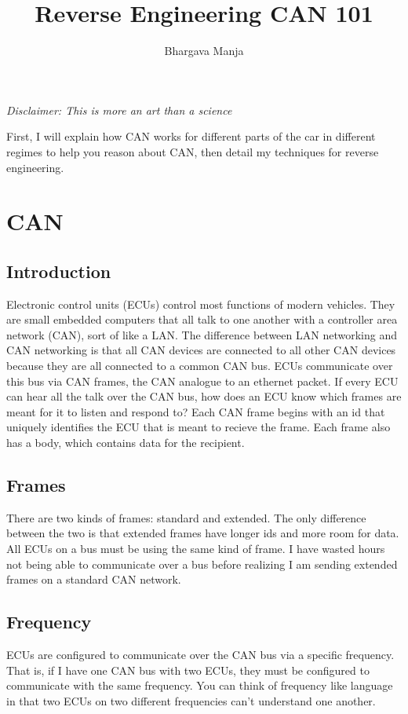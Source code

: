 \documentclass[12pt]{article}
\begin{document}
\title{Reverse Engineering CAN 101}
\author{Bhargava Manja}
\maketitle

\textit{Disclaimer: This is more an art than a science}

First, I will explain how CAN works for different parts of the car in different
regimes to help you reason about CAN, then detail my techniques for reverse
engineering.

\section{CAN}
\subsection{Introduction}
Electronic control units (ECUs) control most functions of modern vehicles. They
are small embedded computers that all talk to one another with a controller
area network (CAN), sort of like a LAN. The difference between LAN networking
and CAN networking is that all CAN devices are connected to all other CAN devices
because they are all connected to a common CAN bus. ECUs communicate over this
bus via CAN frames, the CAN analogue to an ethernet packet. If every ECU can
hear all the talk over the CAN bus, how does an ECU know which frames are meant
for it to listen and respond to? Each CAN frame begins with an id that uniquely
identifies the ECU that is meant to recieve the frame. Each frame also has
a body, which contains data for the recipient. 

\subsection{Frames}
There are two kinds of frames: standard and extended. The only difference
between the two is that extended frames have longer ids and more room for data.
All ECUs on a bus must be using the same kind of frame. I have wasted hours not
being able to communicate over a bus before realizing I am sending extended
frames on a standard CAN network.

\subsection{Frequency}
ECUs are configured to communicate over the CAN bus via a specific frequency.
That is, if I have one CAN bus with two ECUs, they must be configured to
communicate with the same frequency. You can think of frequency like language
in that two ECUs on two different frequencies can't understand one another.
\end{document}
